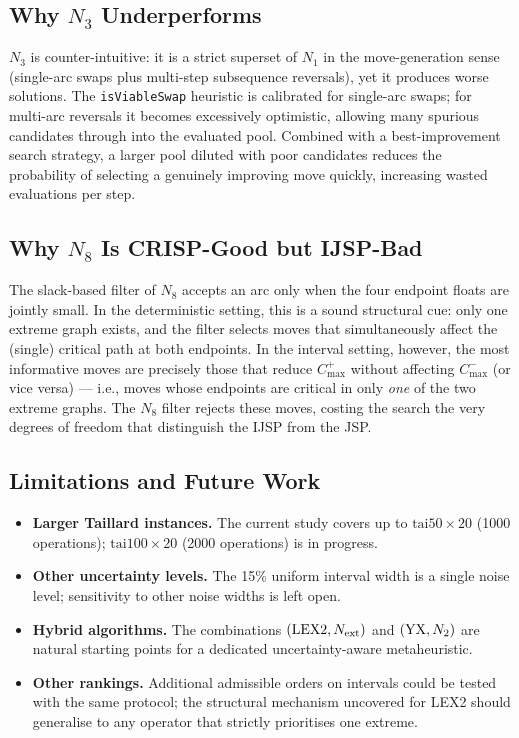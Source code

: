 \documentclass[preprint,12pt]{elsarticle}
\begin{document}
\subsection{Why $N_3$ Underperforms}
\label{sec7.3}

$N_3$ is counter-intuitive: it is a strict superset of $N_1$ in the move-generation sense (single-arc swaps plus multi-step subsequence reversals), yet it produces worse solutions. The \texttt{isViableSwap} heuristic is calibrated for single-arc swaps; for multi-arc reversals it becomes excessively optimistic, allowing many spurious candidates through into the evaluated pool. Combined with a best-improvement search strategy, a larger pool diluted with poor candidates reduces the probability of selecting a genuinely improving move quickly, increasing wasted evaluations per step.

\subsection{Why $N_8$ Is CRISP-Good but IJSP-Bad}
\label{sec7.4}

The slack-based filter of $N_8$ accepts an arc only when the four endpoint floats are jointly small. In the deterministic setting, this is a sound structural cue: only one extreme graph exists, and the filter selects moves that simultaneously affect the (single) critical path at both endpoints. In the interval setting, however, the most informative moves are precisely those that reduce $C^+_{\max}$ without affecting $C^-_{\max}$ (or vice versa) --- i.e., moves whose endpoints are critical in only \emph{one} of the two extreme graphs. The $N_8$ filter rejects these moves, costing the search the very degrees of freedom that distinguish the IJSP from the JSP.

\subsection{Limitations and Future Work}
\label{sec7.5}

\begin{itemize}
\item \textbf{Larger Taillard instances.} The current study covers up to $\text{tai}50 \times 20$ (1000 operations); $\text{tai}100 \times 20$ (2000 operations) is in progress.
\item \textbf{Other uncertainty levels.} The 15\% uniform interval width is a single noise level; sensitivity to other noise widths is left open.
\item \textbf{Hybrid algorithms.} The combinations $({\rm LEX2}, N_{\rm ext})$ and $({\rm YX}, N_2)$ are natural starting points for a dedicated uncertainty-aware metaheuristic.
\item \textbf{Other rankings.} Additional admissible orders on intervals \cite{Bustince2013} could be tested with the same protocol; the structural mechanism uncovered for LEX2 should generalise to any operator that strictly prioritises one extreme.
\end{itemize}
\end{document}
